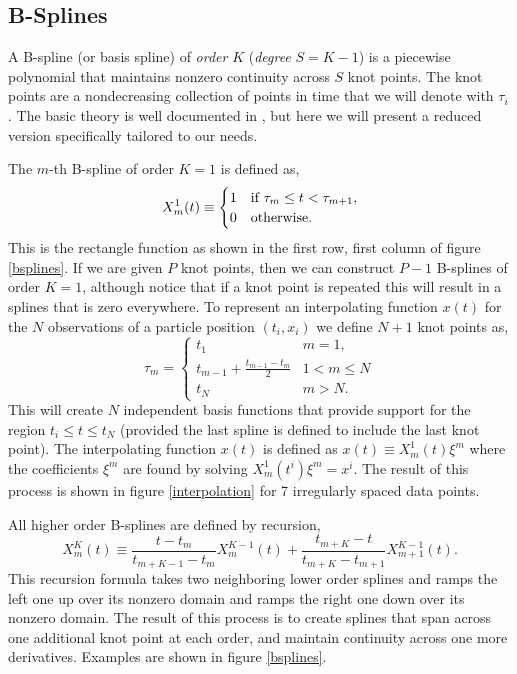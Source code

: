 \documentclass[10pt,journal]{IEEEtran}
\begin{document}
\subsection{B-Splines}

A B-spline (or basis spline) of \emph{order} $K$ (\emph{degree} $S=K-1$) is a piecewise polynomial that maintains nonzero continuity across $S$ knot points. The knot points are a nondecreasing collection of points in time that we will denote with $\tau_i$. The basic theory is well documented in \cite{deboor1978-book}, but here we will present a reduced version specifically tailored to our needs.

The $m$-th B-spline of order $K=1$ is defined as,
\begin{equation}
X^1_m(t) \equiv \begin{cases}
1      & \text{if $ \tau_m \leq t < \tau_{m+1}$}, \\
0     & \text{otherwise}.
\end{cases}
\end{equation}
This is the rectangle function as shown in the first row, first column of figure \ref{bsplines}. If we are given $P$ knot points, then we can construct $P-1$ B-splines of order $K=1$, although notice that if a knot point is repeated this will result in a splines that is zero everywhere. To represent an interpolating function $x(t)$ for the $N$ observations of a particle position $(t_i,x_i)$ we define $N+1$ knot points as,
\begin{equation}
\tau_m = \begin{cases}
t_1      & \text{$m=1$}, \\
t_{m-1} + \frac{t_{m-1}-t_m}{2}	  & \text{$1<m \leq N$}\\
t_N     & \text{$m>N$}.
\end{cases}
\end{equation}
This will create $N$ independent basis functions that provide support for the region $t_i \leq t \leq t_N$ (provided the last spline is defined to include the last knot point). The interpolating function $x(t)$ is defined as $x(t) \equiv  X^1_m(t) \xi^m$ where the coefficients $\xi^m$ are found by solving $X^1_m(t^i) \xi^m = x^i$. The result of this process is shown in figure \ref{interpolation} for 7 irregularly spaced data points.

All higher order B-splines are defined by recursion,
\begin{equation}
X^K_m(t) \equiv \frac{t - t_m}{t_{m+K-1} - t_m} X^{K-1}_m(t) + \frac{t_{m+K}-t}{t_{m+K} - t_{m+1}} X^{K-1}_{m+1}(t).
\end{equation}
This recursion formula takes two neighboring lower order splines and ramps the left one up over its nonzero domain and ramps the right one down over its nonzero domain. The result of this process is to create splines that span across one additional knot point at each order, and maintain continuity across one more derivatives. Examples are shown in figure \ref{bsplines}.
\end{document}
